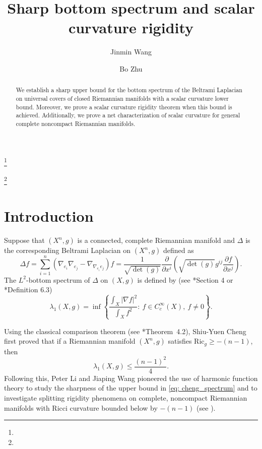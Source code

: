 \documentclass[12pt, reqno]{amsart}
\theoremstyle{plain}%
\theoremstyle{definition}
\theoremstyle{remark}
\numberwithin{equation}{section}
\newcommand{\Ric}{\mathrm{Ric}}
\begin{document}
\title[Sharp bottom spectrum and scalar curvature rigidity]{Sharp bottom spectrum and scalar curvature rigidity}

\author{Jinmin Wang}
\address[Jinmin Wang]{Institute of Mathematics, Chinese Academy of Sciences}
\thanks{}



\author{Bo Zhu}
\address[Bo Zhu]{ Yau Mathematical Sciences Center,  Tsinghua University}
\thanks{}

\begin{abstract}
 We establish a sharp upper bound for the bottom spectrum of the Beltrami Laplacian on universal covers of closed Riemannian manifolds with a scalar curvature lower bound. Moreover, we prove a scalar curvature rigidity theorem when this bound is achieved. Additionally, we prove a net characterization of scalar curvature for general complete noncompact Riemannian manifolds.
\end{abstract}
\maketitle






\section{Introduction}


Suppose that  $(X^n,g)$ is  a connected,  complete Riemannian manifold and $\Delta$ is the corresponding Beltrami Laplacian on $(X^n,g)$  defined as
\begin{equation*} \label{def: laplace} 
	\Delta f = \sum_{i=1}^n \left(\nabla_{e_i}\nabla_{e_j}  - \nabla_{\nabla_{e_i} e_j}\right) f = \frac{1}{\sqrt{\det(g)}} \frac{\partial}{\partial x^i}\left(\sqrt{\det(g)}g^{ij}\frac{\partial f }{\partial x^j}\right).
\end{equation*}
The $L^2$-bottom spectrum of $\Delta$  on $(X,g)$ is defined by (see  \cite{Cheng_eigenvalue}*{Section 4} or \cite{Li_geometric_analysis}*{Definition 6.3})
\begin{equation}\label{def: lambda_1}
	\lambda_1(X,g) = \inf \left\{ \frac{\int_X |\nabla f|^2}{ \int_X f^2}: \ f \in C_c^\infty(X), \ f \neq 0\right\}.
\end{equation}


Using the classical comparison theorem (see \cite{Cheng_eigenvalue}*{Theorem~4.2}), Shiu-Yuen Cheng first proved that if a Riemannian manifold $(X^n, g)$ satisfies $\Ric_g \geq -(n-1)$, then
\begin{equation} \label{eq: cheng_spectrum}
    \lambda_1(X, g) \leq \frac{(n-1)^2}{4}.
\end{equation}
Following this, Peter Li and Jiaping Wang pioneered the use of harmonic function theory to study the sharpness of the upper bound in \eqref{eq: cheng_spectrum} and to investigate splitting rigidity phenomena on complete, noncompact Riemannian manifolds with Ricci curvature bounded below by $-(n-1)$ (see \cites{Li_Wang_positive_spectrum_1,Li_Wang_positive_spectrum_2}).
\end{document}
